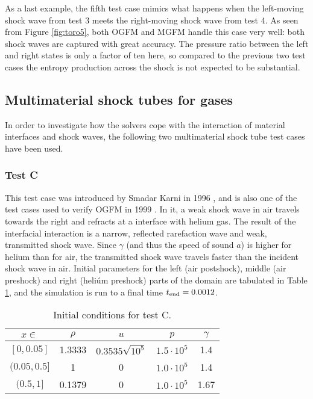 \documentclass[final,3p,twocolumn]{elsarticle}
\begin{document}
As a last example, the fifth test case mimics what happens when the left-moving
shock wave from test 3 meets the right-moving shock wave from test 4. As seen
from Figure \ref{fig:toro5}, both OGFM and MGFM handle this case very well:
both shock waves are captured with great accuracy. The pressure ratio between
the left and right states is only a factor of ten here, so compared to the
previous two test cases the entropy production across the shock is not expected
to be substantial. 

\subsection{Multimaterial shock tubes for gases}
\label{subsec:shocktubes}

In order to investigate how the solvers cope with the interaction of material
interfaces and shock waves, the following two multimaterial shock tube test
cases have been used. 

\subsubsection{Test C}

This test case was introduced by Smadar Karni in 1996 \cite{karni1996hybrid},
and is also one of the test cases used to verify OGFM in 1999
\cite{fedkiw1999nonoscillatory}. In it, a weak shock wave in air travels
towards the right and refracts at a interface with helium gas. The result of
the interfacial interaction is a narrow, reflected rarefaction wave and weak,
transmitted shock wave. Since $\gamma$ (and thus the speed of sound $a$) is
higher for helium than for air, the transmitted shock wave travels faster than
the incident shock wave in air.  Initial parameters for the left (air
postshock), middle (air preshock) and right (heliúm preshock) parts of the
domain are tabulated in Table \ref{tab:testC}, and the simulation is run to a
final time $t_{\rm end}=0.0012$. 

\begin{table}[htb]
    \centering
    \begin{tabular}{ccccc}
        \hline
        $x \in $ & $\rho$ & $u$ & $p$ & $\gamma$ \\
        \hline
        $[0,0.05]$ & 1.3333 & $0.3535\sqrt{10^5}$ & $1.5\cdot 10^5$ & 1.4 \\
        $(0.05,0.5]$ & 1 & 0 & $1.0\cdot 10^5$ & 1.4 \\
        $(0.5,1]$ & 0.1379 & 0 & $1.0\cdot 10^5$ & 1.67 \\
        \hline
    \end{tabular}
    \caption{Initial conditions for test C.}
    \label{tab:testC}
\end{table}
\end{document}
